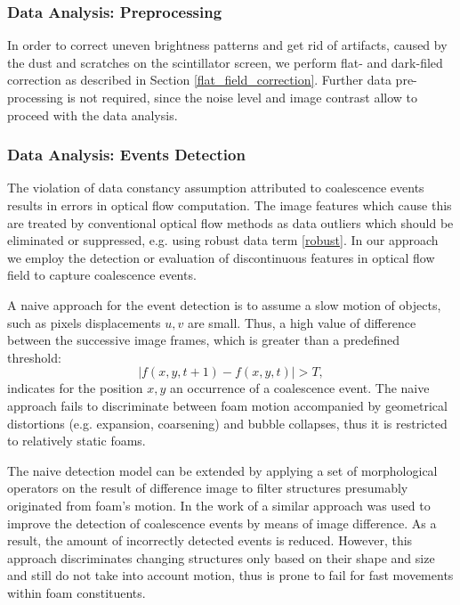 \subsubsection{Data Analysis: Preprocessing}


In order to correct uneven brightness patterns and get rid of artifacts, caused by the dust and scratches on the scintillator screen, we perform flat- and dark-filed correction as described in Section \ref{flat_field_correction}. Further data pre-processing is not required, since the noise level and image contrast allow to proceed with the data analysis.   


\subsubsection{Data Analysis: Events Detection}

The violation of data constancy assumption attributed to coalescence events  results in errors in optical flow computation. The image features which cause this are treated by conventional optical flow methods as data outliers which should be eliminated or suppressed, e.g. using robust data term \ref{robust}.
In our approach we employ the detection or evaluation of discontinuous
features in optical flow field to capture coalescence events.


A naive approach for the event detection is to assume a slow motion of objects, such as pixels displacements $u,v$ are small. Thus, a high value of difference between the successive
image frames, which is greater than a predefined threshold:
$$ |f(x,y,t+1) - f(x,y,t)| > T,$$
indicates for the position $x,y$ an occurrence of a coalescence
event. The naive approach fails to discriminate between
foam motion accompanied by geometrical distortions (e.g. expansion, coarsening)
and bubble collapses, thus it is restricted to relatively static foams.


The naive detection model can be extended by applying a
set of morphological operators on the result of difference image to
filter structures presumably originated from foam's motion. In the work of \cite{GarciaMoreno04} a similar approach was used to improve the detection of coalescence events by means of image difference. As a result, the amount of incorrectly detected events is reduced. However, this approach discriminates
changing structures only based on their shape and size and still do not take into account motion, thus is prone to fail for fast movements within foam constituents.


